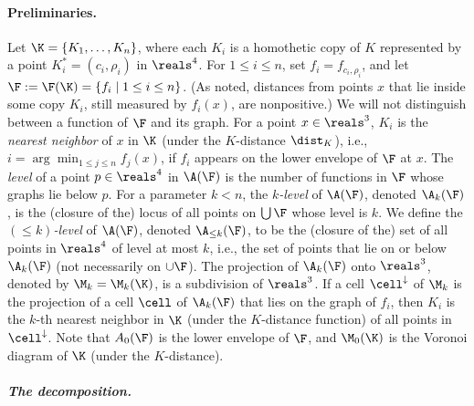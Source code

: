 \paragraph{Preliminaries.}
\fi
Let $\K = \{K_1, \ldots, K_n\}$, where each $K_i$ 
is a homothetic copy of $K$ represented by a point $K_i^* = (c_i,\rho_i)$ in $\reals^4$.
For $1 \le i \le n$, set $f_i = f_{c_i,\rho_i}$, and let 
$\F := \F(\K) = \{ f_i \mid 1 \le i \le n\}$.
(As noted, distances from points $x$ that lie inside some copy $K_i$, still measured by $f_i(x)$, are nonpositive.)
We will not distinguish between a function of $\F$ and its graph.
For a point $x\in\reals^3$, $K_i$ is the \emph{nearest neighbor} of $x$ in $\K$ 
(under the $K$-distance $\dist_K$), i.e., $i = \arg\min_{1 \le j \le n} f_j(x)$, if
$f_i$ appears on the lower envelope of $\F$ at $x$. 
%
The \emph{level} of a point $p\in\reals^4$ in $\A(\F)$ is the number of functions in $\F$ whose graphs lie below $p$.
For a parameter $k < n$, the \emph{$k$-level} of $\A(\F)$, denoted $\A_k(\F)$, is the 
(closure of the) locus of all points on $\bigcup \F$ whose level is $k$.
We define the \emph{$(\le k)$-level} of $\A(\F)$, denoted $\A_{\le k}(\F)$, to be 
the (closure of the) set of all points in $\reals^4$ of level at most $k$, i.e., 
the set of points that lie on or below $\A_k(\F)$ (not necessarily on $\cup\F$).
The projection of $\A_k(\F)$ onto $\reals^3$, 
denoted by $\M_k = \M_k (\K)$, is a subdivision of $\reals^3$. 
If a cell $\cell^\downarrow$ of $\M_k$ is the projection of a cell $\cell$ of 
$\A_k(\F)$ that lies on the graph of $f_i$, 
then $K_i$ is the $k$-th nearest neighbor in $\K$ (under the $K$-distance function)
of all points in $\cell^\downarrow$. Note that $A_0(\F)$ is the lower envelope of $\F$, 
and $\M_0(\K)$ is the Voronoi diagram of $\K$ (under the $K$-distance).
%
\ifsocgproc 
\subparagraph*{The decomposition.}
\else
